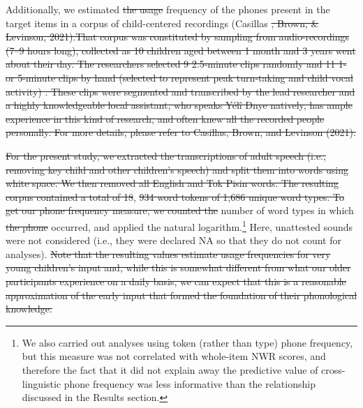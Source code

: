 \documentclass[english,,man,floatsintext]{apa6} %
\providecommand{\DIFaddtex}[1]{{\protect\color{blue}\uwave{#1}}} %
\providecommand{\DIFdeltex}[1]{{\protect\color{red}\sout{#1}}}                      %
\providecommand{\DIFaddbegin}{} %
\providecommand{\DIFaddend}{} %
\providecommand{\DIFdelbegin}{} %
\providecommand{\DIFdelend}{} %
\providecommand{\DIFadd}[1]{\texorpdfstring{\DIFaddtex{#1}}{#1}} %
\providecommand{\DIFdel}[1]{\texorpdfstring{\DIFdeltex{#1}}{}} %
\newcommand{\DIFscaledelfig}{0.5}
\newlength{\DIFdelgraphicswidth} %
\newlength{\DIFdelgraphicsheight} %
\newcommand{\DIFaddincludegraphics}[2][]{{\color{blue}\fbox{\DIFOincludegraphics[#1]{#2}}}} %
\newcommand{\DIFdelincludegraphics}[2][]{%
	\sbox{\DIFdelgraphicsbox}{\DIFOincludegraphics[#1]{#2}}%
	\settoboxwidth{\DIFdelgraphicswidth}{\DIFdelgraphicsbox} %
	\settoboxtotalheight{\DIFdelgraphicsheight}{\DIFdelgraphicsbox} %
	\scalebox{\DIFscaledelfig}{%
		\parbox[b]{\DIFdelgraphicswidth}{\usebox{\DIFdelgraphicsbox}\\[-\baselineskip] \rule{\DIFdelgraphicswidth}{0em}}\llap{\resizebox{\DIFdelgraphicswidth}{\DIFdelgraphicsheight}{%
				\setlength{\unitlength}{\DIFdelgraphicswidth}%
				\begin{picture}(1,1)%
				\thicklines\linethickness{2pt} %
				{\color[rgb]{1,0,0}\put(0,0){\framebox(1,1){}}}%
				{\color[rgb]{1,0,0}\put(0,0){\line( 1,1){1}}}%
				{\color[rgb]{1,0,0}\put(0,1){\line(1,-1){1}}}%
				\end{picture}%
			}\hspace*{3pt}}} %
} %
\DeclareRobustCommand{\DIFaddbegin}{\DIFOaddbegin \let\includegraphics\DIFaddincludegraphics} %
\DeclareRobustCommand{\DIFaddend}{\DIFOaddend \let\includegraphics\DIFOincludegraphics} %
\DeclareRobustCommand{\DIFdelbegin}{\DIFOdelbegin \let\includegraphics\DIFdelincludegraphics} %
\DeclareRobustCommand{\DIFdelend}{\DIFOaddend \let\includegraphics\DIFOincludegraphics} %
\begin{document}
\DIFdelbegin %

\DIFdelend Additionally, we estimated \DIFdelbegin \DIFdel{the usage }\DIFdelend frequency of the phones present in the target items in a corpus of child-centered recordings (Casillas \DIFdelbegin \DIFdel{, Brown, \& Levinson, 2021).That corpus was constituted by sampling from audio-recordings (7--9 hours long), collected as 10 children aged between 1 month and 3 years went about their day. The researchers selected 9 2.5-minute clips randomly and 11 1- or 5-minute clips by hand (selected to represent peak turn-taking and child vocal activity) . These clips were segmented and transcribed by the lead researcher and a highly knowledgeable local assistant, who speaks Yélî Dnye natively, has ample experience in this kind of research, and often knew all the recorded people personally. For more details, please refer to Casillas, Brown, and Levinson (2021).
}%

\DIFdel{For the present study, we extracted the transcriptions of adult speech (i.e., removing key child and other children's speech) and split them into words using white space. We then removed all English and Tok Pisin words. The resulting corpus contained a total of 18}\DIFdelend \DIFaddbegin \DIFadd{et al.}\DIFaddend , \DIFdelbegin \DIFdel{934 word tokens of 1,686 unique word types. To get our phone frequency measure, we counted the }\DIFdelend \DIFaddbegin \DIFadd{2020) by counting the }\DIFaddend number of word types in which \DIFdelbegin \DIFdel{the phone }\DIFdelend \DIFaddbegin \DIFadd{they }\DIFaddend occurred, and applied the natural logarithm.\footnote{We also carried out analyses using token (rather than type) phone frequency, but this measure was not correlated with whole-item NWR scores, and therefore the fact that it did not explain away the predictive value of cross-linguistic phone frequency was less informative than the relationship discussed in the Results section.} Here, unattested sounds were not considered (i.e., they were declared NA so that they do not count for analyses).
\DIFdelbegin \DIFdel{Note that the resulting values estimate usage frequencies for very young children's input and, while this is somewhat different from what our older participants experience on a daily basis, we can expect that this is a reasonable approximation of the early input that formed the foundation of their phonological knowledge.
}\DIFdelend 
\end{document}
